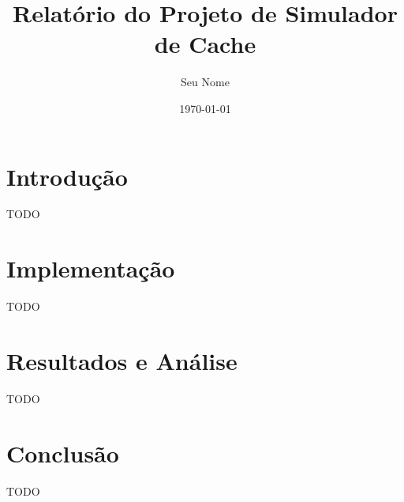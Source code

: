 \documentclass[11pt,a4paper]{article}
\title{Relatório do Projeto de Simulador de Cache}
\author{Seu Nome}
\date{\today}
\begin{document}
\maketitle

\section{Introdução}
TODO

\section{Implementação}
TODO

\section{Resultados e Análise}
TODO

\section{Conclusão}
TODO
\end{document}
